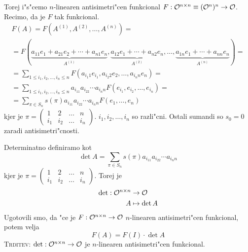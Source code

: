 Torej i"s"cemo $n$-linearen antisimetri"cen funkcional $F: \mathcal{O}^{n \times n} \equiv (\mathcal{O}^n)^n \to \mathcal{O}$. Recimo, da je $F$ tak funkcional.
\begin{multline*}
F(A) = F(A^{(1)}, A^{(2)}, \ldots, A^{(n)}) = \\
= F(\underbrace{a_{11} e_1 + a_{21} e_2 + \cdots + a_{n1}e_n}_{A^{(1)}}, \underbrace{a_{12} e_1  + \cdots + a_{n2} e_n}_{A^{(2)}}, \ldots, \underbrace{a_{1n} e_1  + \cdots + a_{nn} e_n}_{A^{(n)}}) = \\
= \sum_{1 \leq i_1, i_2, \ldots, i_n \leq n} F(a_{{i_1}1} e_{i_1}, a_{{i_2}2} e_2, \ldots, a_{{i_n}n}e_n) = \\
= \sum_{1 \leq i_1, i_2, \ldots, i_n \leq n} a_{i_11} a_{i_22} \cdots a_{i_nn} F(e_{i_1}, e_{i_2}, \ldots, e_{i_n}) = \\
= \sum_{\pi \in S_n} s(\pi) a_{i_11} a_{i_22} \cdots a_{i_nn} F(e_1, \ldots, e_n)
\end{multline*}
kjer je $\pi = \begin{pmatrix}
1 & 2 & \ldots & n \\
i_1 & i_2 & \ldots & i_n
\end{pmatrix}$. $i_1, i_2, \ldots, i_n$ so razli"cni. Ostali sumandi so $s_0 = 0$ zaradi antisimetri"cnosti.

Determinatno definiramo kot
\begin{equation*}
\det A = \sum_{\pi \in S_n} s(\pi) a_{i_11} a_{i_22} \cdots a_{i_nn}
\end{equation*}
kjer je $\pi = \begin{pmatrix}
1 & 2 & \ldots & n \\
i_1 & i_2 & \ldots & i_n
\end{pmatrix}$. Torej je
\begin{align*}
\det: \mathcal{O}^{n \times n} &\to \mathcal{O} \\
A &\mapsto \det A
\end{align*}
Ugotovili smo, da "ce je $F: \mathcal{O}^{n \times n} \to \mathcal{O}$ $n$-linearen antisimetri"cen funkcional, potem velja
\begin{equation*}
F(A) = F(I) \cdot \det A
\end{equation*}
\textsc{Trditev:} $\det: \mathcal{O}^{n \times n} \to \mathcal{O}$ je $n$-linearen antisimetri"cen funkcional.

